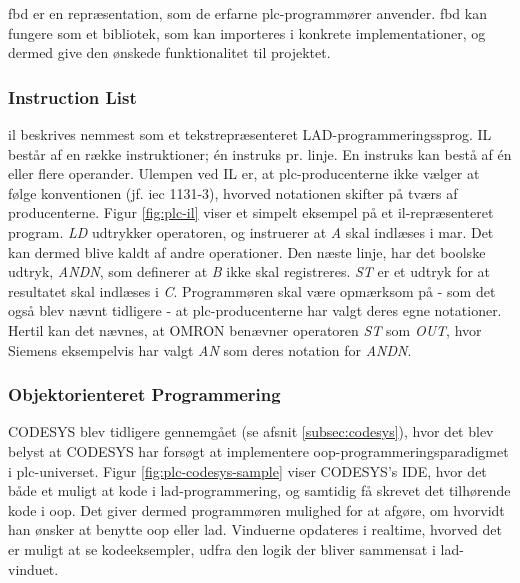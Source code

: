 
\noindent \gls{fbd} er en repræsentation, som de erfarne \gls{plc}-programmører anvender. \gls{fbd} kan fungere som et bibliotek, som kan importeres i konkrete implementationer, og dermed give den ønskede funktionalitet til projektet. \cite{FDB_desc}

\subsubsection{Instruction List}
\gls{il} beskrives nemmest som et tekstrepræsenteret LAD-programmeringssprog. IL består af en række instruktioner; én instruks pr. linje. En instruks kan bestå af én eller flere operander. Ulempen ved IL er, at \gls{plc}-producenterne ikke vælger at følge konventionen (jf. \gls{iec} 1131-3), hvorved notationen skifter på tværs af producenterne. Figur \ref{fig:plc-il} viser et simpelt eksempel på et \gls{il}-repræsenteret program. \textit{LD} udtrykker operatoren, og instruerer at \textit{A} skal indlæses i \gls{mar}. Det kan dermed blive kaldt af andre operationer. Den næste linje, har det boolske udtryk, \textit{ANDN}, som definerer at \textit{B} ikke skal registreres. \textit{ST} er et udtryk for at resultatet skal indlæses i \textit{C}. Programmøren skal være opmærksom på - som det også blev nævnt tidligere - at \gls{plc}-producenterne har valgt deres egne notationer. Hertil kan det nævnes, at OMRON benævner operatoren \textit{ST} som \textit{OUT}, hvor Siemens eksempelvis har valgt \textit{AN} som deres notation for \textit{ANDN}. \cite{FDB_desc}


\subsubsection{Objektorienteret Programmering}
\label{subsec:software_codesys}

CODESYS blev tidligere gennemgået (se afsnit \ref{subsec:codesys}), hvor det blev belyst at CODESYS har forsøgt at implementere \gls{oop}-programmeringsparadigmet i \gls{plc}-universet. Figur \ref{fig:plc-codesys-sample} viser CODESYS's IDE, hvor det både et muligt at kode i \gls{lad}-programmering, og samtidig få skrevet det tilhørende kode i \gls{oop}. Det giver dermed programmøren mulighed for at afgøre, om hvorvidt han ønsker at benytte \gls{oop} eller \gls{lad}. Vinduerne opdateres i realtime, hvorved det er muligt at se kodeeksempler, udfra den logik der bliver sammensat i \gls{lad}-vinduet. 

